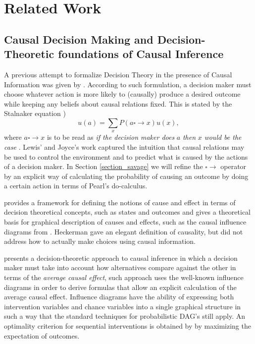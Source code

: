 \documentclass[review]{elsarticle}
\begin{document}
\section{Related Work}
\label{related_work}
\subsection{Causal Decision Making and Decision-Theoretic foundations of Causal Inference}
\label{joyce_theory}
A previous attempt to formalize Decision Theory in the presence of Causal Information was given by \cite{lewis1981causal,joyce1999foundations}. According to such formulation, a decision maker must choose whatever action is more likely to (causally) produce a desired outcome while keeping any beliefs about causal relations fixed. This is stated by the Stalnaker equation \citep{stalnaker1968})
\begin{equation}
u(a)=\sum_{x} P(a \square \to x)u(x),
\end{equation}
\noindent
where $a \square \to x$ is to be read as \textit{if the decision maker does} $a$ \textit{then} $x$ \textit{would be the case} \citep{gibbard1978counterfactuals,kleinberg2013causality}. Lewis' and Joyce's work captured the intuition that causal relations may be used to control the environment and to predict what is caused by the actions of a decision maker. In Section \ref{section_savage} we will refine the $\square \to$ operator by an explicit way of calculating the probability of causing an outcome by doing a certain action in terms of Pearl's do-calculus.

\cite{heckerman1995decision} provides a framework for defining the notions of cause and effect in terms of decision theoretical concepts, such as states and outcomes and gives a theoretical basis for graphical description of causes and effects, such as the causal influence diagrams from \citep{dawid2002influence}. Heckerman gave an elegant definition of causality, but did not address how to actually make choices using causal information.

\cite{dawid2012decision} presents a decision-theoretic approach to causal inference in which a decision maker must take into account how alternatives compare against the other in terms of the \textit{average causal effect}, such approach uses the well-known influence diagrams \citep{dawid2002influence,dawid2003causal} in order to derive formulas that allow an explicit calculation of the average causal effect. Influence diagrams have the ability of expressing both intervention variables and chance variables into a single graphical structure in such a way that the standard techniques for probabilistic DAG's still apply. An optimality criterion for sequential interventions is obtained by \cite{dawid2008identifying} by maximizing the expectation of outcomes.
\end{document}

